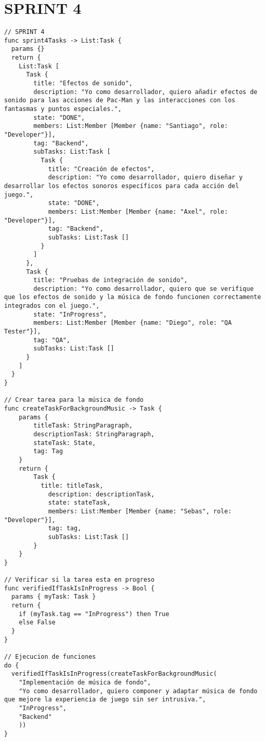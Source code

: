 \documentclass{article}
\begin{document}
\section{SPRINT 4}
\begin{verbatim}
// SPRINT 4
func sprint4Tasks -> List:Task {
  params {}
  return {
    List:Task [
      Task {
        title: "Efectos de sonido",
        description: "Yo como desarrollador, quiero añadir efectos de sonido para las acciones de Pac-Man y las interacciones con los fantasmas y puntos especiales.",
        state: "DONE",
        members: List:Member [Member {name: "Santiago", role: "Developer"}],
        tag: "Backend",
        subTasks: List:Task [
          Task {
            title: "Creación de efectos",
            description: "Yo como desarrollador, quiero diseñar y desarrollar los efectos sonoros específicos para cada acción del juego.",
            state: "DONE",
            members: List:Member [Member {name: "Axel", role: "Developer"}],
            tag: "Backend",
            subTasks: List:Task []
          }
        ]
      },
      Task {
        title: "Pruebas de integración de sonido",
        description: "Yo como desarrollador, quiero que se verifique que los efectos de sonido y la música de fondo funcionen correctamente integrados con el juego.",
        state: "InProgress",
        members: List:Member [Member {name: "Diego", role: "QA Tester"}],
        tag: "QA",
        subTasks: List:Task []
      }
    ]
  }
}

// Crear tarea para la música de fondo
func createTaskForBackgroundMusic -> Task {
    params {
        titleTask: StringParagraph,
        descriptionTask: StringParagraph,
        stateTask: State,
        tag: Tag
    }
    return {
        Task {
          title: titleTask,
	        description: descriptionTask,
	        state: stateTask,
	        members: List:Member [Member {name: "Sebas", role: "Developer"}],
	        tag: tag,
	        subTasks: List:Task []
        }
    }
}

// Verificar si la tarea esta en progreso
func verifiedIfTaskIsInProgress -> Bool {
  params { myTask: Task }
  return {
    if (myTask.tag == "InProgress") then True
    else False
  }
}

// Ejecucion de funciones 
do {
  verifiedIfTaskIsInProgress(createTaskForBackgroundMusic(
    "Implementación de música de fondo", 
    "Yo como desarrollador, quiero componer y adaptar música de fondo que mejore la experiencia de juego sin ser intrusiva.", 
    "InProgress", 
    "Backend"
    ))
}
\end{verbatim}
\end{document}
